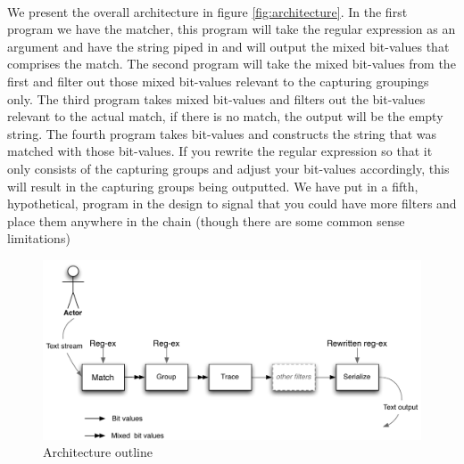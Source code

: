 \paragraph{}
We present the overall architecture in figure
\vref{fig:architecture}. In the first program we have the matcher,
this program will take the regular expression as an argument and have
the string piped in and will output the mixed bit-values that
comprises the match. The second program will take the mixed bit-values
from the first and filter out those mixed bit-values relevant to the
capturing groupings only. The third program takes mixed bit-values and
filters out the bit-values relevant to the actual match, if there is
no match, the output will be the empty string. The fourth program
takes bit-values and constructs the string that was matched with those
bit-values. If you rewrite the regular expression so that it only
consists of the capturing groups and adjust your bit-values
accordingly, this will result in the capturing groups being
outputted. We have put in a fifth, hypothetical, program in the design to signal that
you could have more filters and place them anywhere in the chain (though there are some common sense limitations)
\begin{figure}
  \centering
  \includegraphics[width=\textwidth]{design/architecture.pdf}
  \caption{Architecture outline}
  \label{fig:architecture}
\end{figure}


 

